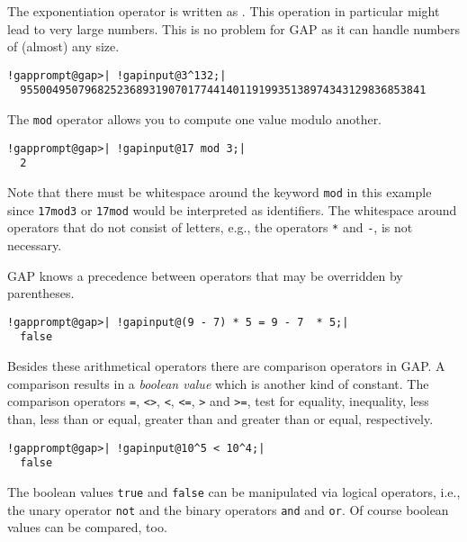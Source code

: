 \documentclass[a4paper,11pt]{report}
\begin{document}
{{ The exponentiation operator is written as \texttt{\texttt{}}. This operation in particular might lead to very large numbers. This is no
problem for \textsf{GAP} as it can handle numbers of (almost) any size. 

 
\begin{Verbatim}[commandchars=!@|,fontsize=\small,frame=single,label=Example]
  !gapprompt@gap>| !gapinput@3^132;|
  955004950796825236893190701774414011919935138974343129836853841
\end{Verbatim}
 

 The \texttt{mod} operator allows you to compute one value modulo another. 

 
\begin{Verbatim}[commandchars=!@|,fontsize=\small,frame=single,label=Example]
  !gapprompt@gap>| !gapinput@17 mod 3;|
  2
\end{Verbatim}
 

 Note that there must be whitespace around the keyword \texttt{mod} in this example since \texttt{17mod3} or \texttt{17mod} would be interpreted as identifiers. The whitespace around operators that do
not consist of letters, e.g., the operators \texttt{*} and \texttt{-}, is not necessary. 

 \textsf{GAP} knows a precedence between operators that may be overridden by parentheses. 

 
\begin{Verbatim}[commandchars=!@|,fontsize=\small,frame=single,label=Example]
  !gapprompt@gap>| !gapinput@(9 - 7) * 5 = 9 - 7  * 5;|
  false
\end{Verbatim}
 

 Besides these arithmetical operators there are comparison operators in \textsf{GAP}. A comparison results in a \emph{boolean value} which is another kind of constant. The comparison operators \texttt{=}, \texttt{{\textless}{\textgreater}}, \texttt{{\textless}}, \texttt{{\textless}=}, \texttt{{\textgreater}} and \texttt{{\textgreater}=}, test for equality, inequality, less than, less than or equal, greater than
and greater than or equal, respectively. 

 
\begin{Verbatim}[commandchars=!@|,fontsize=\small,frame=single,label=Example]
  !gapprompt@gap>| !gapinput@10^5 < 10^4;|
  false
\end{Verbatim}
 

 The boolean values \texttt{true} and \texttt{false} can be manipulated via logical operators, i.{\nobreakspace}e., the unary
operator \texttt{not} and the binary operators \texttt{and} and \texttt{or}. Of course boolean values can be compared, too. 

}}
\end{document}

